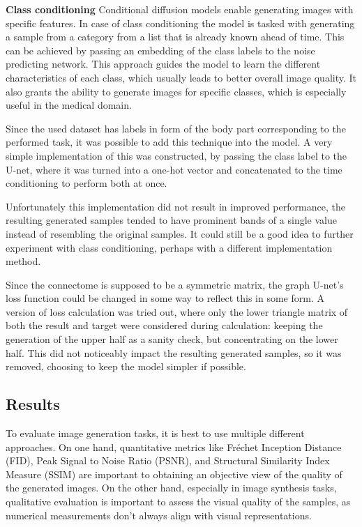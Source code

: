 	
	
	\textbf{Class conditioning} Conditional diffusion models enable generating images with specific features. In case of class conditioning the model is tasked with generating a sample from a category from a list that is already known ahead of time. This can be achieved by passing an embedding of the class labels to the noise predicting network. This approach guides the model to learn the different characteristics of each class, which usually leads to better overall image quality. It also grants the ability to generate images for specific classes, which is especially useful in the medical domain.
	
	Since the used dataset has labels in form of the body part corresponding to the performed task, it was possible to add this technique into the model. A very simple implementation of this was constructed, by passing the class label to the U-net, where it was turned into a one-hot vector and concatenated to the time conditioning to perform both at once.
	
	Unfortunately this implementation did not result in improved performance, the resulting generated samples tended to have prominent bands of a single value instead of resembling the original samples. It could still be a good idea to further experiment with class conditioning, perhaps with a different implementation method. 
	
	Since the connectome is supposed to be a symmetric matrix, the graph U-net’s loss function could be changed in some way to reflect this in some form. A version of loss calculation was tried out, where only the lower triangle matrix of both the result and target were considered during calculation: keeping the generation of the upper half as a sanity check, but concentrating on the lower half. This did not noticeably impact the resulting generated samples, so it was removed, choosing to keep the model simpler if possible.
	
	\subsection{Results}
	
	To evaluate image generation tasks, it is best to use multiple different approaches. On one hand, quantitative metrics like Fréchet Inception Distance \cite{heusel2017gans} (FID), Peak Signal to Noise Ratio \cite{hore2010image} (PSNR), and Structural Similarity Index Measure \cite{hore2010image} (SSIM) are important to obtaining an objective view of the quality of the generated images. On the other hand, especially in image synthesis tasks, qualitative evaluation is important to assess the visual quality of the samples, as numerical measurements don’t always align with visual representations.
	
